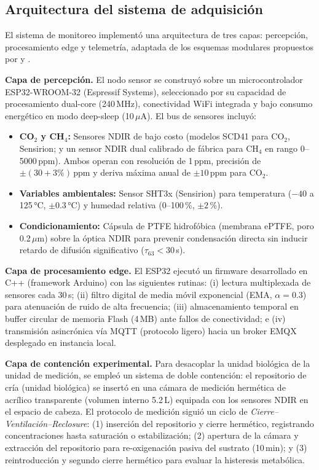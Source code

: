 \subsection{Arquitectura del sistema de adquisición}
\label{subsec:cap2_arquitectura_iot}

El sistema de monitoreo implementó una arquitectura de tres capas:
percepción, procesamiento edge y telemetría, adaptada de los esquemas
modulares propuestos por \autocite{vanIntegrationInternetofThingsSustainable2022a}
y \autocite{duobieneDevelopmentWirelessSensor2022}.

\textbf{Capa de percepción.} El nodo sensor se construyó sobre un
microcontrolador ESP32-WROOM-32 (Espressif Systems), seleccionado por
su capacidad de procesamiento dual-core (240\,MHz), conectividad WiFi
integrada y bajo consumo energético en modo deep-sleep (10\,$\mu$A).
El bus de sensores incluyó:

\begin{itemize}
    \item \textbf{CO$_2$ y CH$_4$:} Sensores NDIR de bajo costo
    (modelos SCD41 para CO$_2$, Sensirion; y un sensor NDIR dual
    calibrado de fábrica para CH$_4$ en rango 0--5000\,ppm). Ambos
    operan con resolución de 1\,ppm, precisión de $\pm(30 + 3\%)$\,ppm
    y deriva máxima anual de $\pm10$\,ppm para CO$_2$.
    
    \item \textbf{Variables ambientales:} Sensor SHT3x (Sensirion)
    para temperatura ($-40$ a 125\,°C, $\pm0.3$\,°C) y humedad
    relativa (0--100\,\%, $\pm2$\,\%).
    
    \item \textbf{Condicionamiento:} Cápsula de PTFE hidrofóbica
    (membrana ePTFE, poro 0.2\,$\mu$m) sobre la óptica NDIR para
    prevenir condensación directa sin inducir retardo de difusión
    significativo ($\tau_{63} < 30$\,s).
\end{itemize}

\textbf{Capa de procesamiento edge.} El ESP32 ejecutó un firmware
desarrollado en C++ (framework Arduino) con las siguientes rutinas:
(i) lectura multiplexada de sensores cada 30\,s; (ii) filtro digital
de media móvil exponencial (EMA, $\alpha = 0.3$) para atenuación de
ruido de alta frecuencia; (iii) almacenamiento temporal en buffer
circular de memoria Flash (4\,MB) ante fallos de conectividad; e
(iv) transmisión asincrónica vía MQTT (protocolo ligero) hacia un
broker EMQX desplegado en instancia local.

\textbf{Capa de contención experimental.} Para desacoplar la unidad
biológica de la unidad de medición, se empleó un sistema de doble
contención: el repositorio de cría (unidad biológica) se insertó en
una cámara de medición hermética de acrílico transparente (volumen
interno 5.2\,L) equipada con los sensores NDIR en el espacio de
cabeza. El protocolo de medición siguió un ciclo de
\textit{Cierre--Ventilación--Reclosure}:
(1) inserción del repositorio y cierre hermético, registrando
concentraciones hasta saturación o estabilización;
(2) apertura de la cámara y extracción del repositorio para
re-oxigenación pasiva del sustrato (10\,min); y
(3) reintroducción y segundo cierre hermético para evaluar la
histeresis metabólica.

